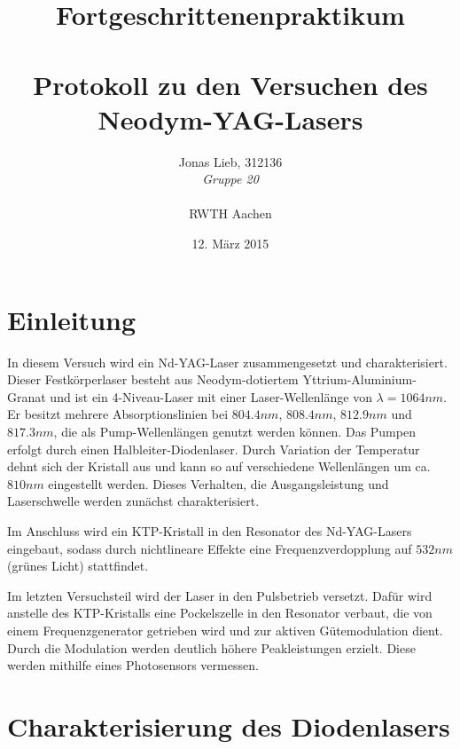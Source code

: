 \documentclass{../Misc/MontavonLaTeX/Montavon}
\date{12. März 2015}
\begin{document}
\title{Fortgeschrittenenpraktikum \\ \quad \\ Protokoll zu den Versuchen des Neodym-YAG-Lasers}
\author{Jonas Lieb, 312136 \\ \emph{Gruppe 20} \\ \\  RWTH Aachen}
\maketitle

\newpage

\setcounter{tocdepth}{2}
\tableofcontents
\newpage

\section{Einleitung}
In diesem Versuch wird ein Nd-YAG-Laser zusammengesetzt und charakterisiert. Dieser Festkörperlaser besteht aus Neodym-dotiertem Yttrium-Aluminium-Granat und ist ein 4-Niveau-Laser mit einer Laser-Wellenlänge von $\lambda = 1064 \unit{nm}$. Er besitzt mehrere Absorptionslinien bei $804.4 \unit{nm}$, $808.4 \unit{nm}$, $812.9 \unit{nm}$ und $817.3 \unit{nm}$, die als Pump-Wellenlängen genutzt werden können.
Das Pumpen erfolgt durch einen Halbleiter-Diodenlaser. Durch Variation der Temperatur dehnt sich der Kristall aus und kann so auf verschiedene Wellenlängen um ca. $810 \unit{nm}$ eingestellt werden. Dieses Verhalten, die Ausgangsleistung und Laserschwelle werden zunächst charakterisiert.

Im Anschluss wird ein KTP-Kristall in den Resonator des Nd-YAG-Lasers eingebaut, sodass durch nichtlineare Effekte eine Frequenzverdopplung auf $532 \unit{nm}$ (grünes Licht) stattfindet.

Im letzten Versuchsteil wird der Laser in den Pulsbetrieb versetzt. Dafür wird anstelle des KTP-Kristalls eine Pockelszelle in den Resonator verbaut, die von einem Frequenzgenerator getrieben wird und zur aktiven Gütemodulation dient. Durch die Modulation werden deutlich höhere Peakleistungen erzielt. Diese werden mithilfe eines Photosensors vermessen.

\section{Charakterisierung des Diodenlasers}
\end{document}
